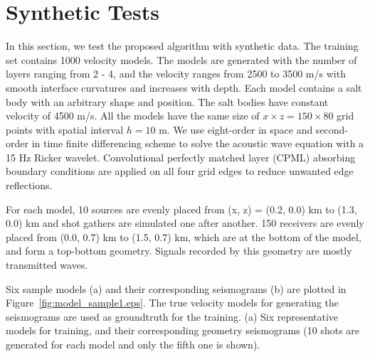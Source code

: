 \documentclass{segabs}
\begin{document}


\section{Synthetic Tests}
In this section, we test the proposed algorithm with synthetic data. 
The training set contains 1000 velocity models. 
The models are generated with the number of layers ranging from 2 - 4, and the velocity ranges from 2500 to 3500 m/s with smooth interface curvatures and increases with depth. 
Each model contains a salt body with an arbitrary shape and position. The salt bodies have constant velocity of 4500 m/s. 
 All the models have the same size of $x\times z = 150 \times 80$ grid points with spatial interval $h=10$ m. 
We use eight-order in space and second-order in time finite differencing scheme to solve the acoustic wave equation with a 15 Hz Ricker wavelet.
Convolutional perfectly matched layer (CPML) absorbing boundary conditions \citep{komatitsch07} are applied on all four grid edges to reduce unwanted edge reflections.

For each model, 10 sources are evenly placed from (x, z) = (0.2, 0.0) km to (1.3, 0.0) km and shot gathers are simulated one after another. 
150 receivers are evenly placed from (0.0, 0.7) km to (1.5, 0.7) km, which are at the bottom of the model, and form a top-bottom geometry. Signals recorded by this geometry are mostly transmitted waves.

Six sample models (a) and their corresponding seismograms (b) are plotted in Figure~\ref{fig:model_sample1.eps}. The true velocity models for generating the seismograms are used as groundtruth for the training. 
{(a) Six representative models for training, and their corresponding geometry seismograms (10 shots are generated for each model and only the fifth one is shown).}
\end{document}
